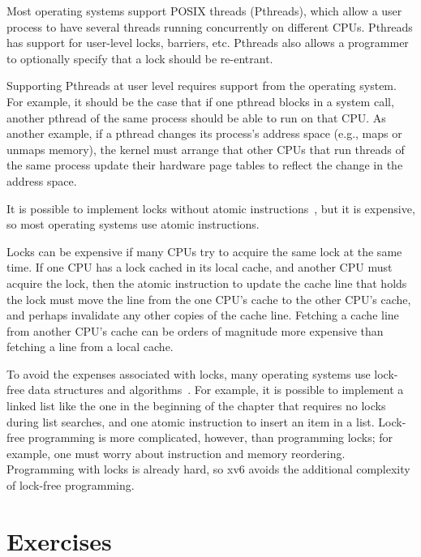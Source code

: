 Most operating systems support POSIX threads (Pthreads), which allow a
user process to have several threads running concurrently on different
CPUs.  Pthreads has support for user-level locks, barriers, etc.
Pthreads also allows a programmer to optionally specify that a lock
should be re-entrant.

Supporting Pthreads at user level requires support from the operating
system. For example, it should be the case that if one pthread blocks
in a system call, another pthread of the same process should be able
to run on that CPU.  As another example, if a pthread changes its
process's address space (e.g., maps or unmaps memory), the kernel must
arrange that other CPUs that run threads of the same process update
their hardware page tables to reflect the change in the address space.

It is possible to implement locks without atomic
instructions~\cite{lamport:bakery}, but it is expensive, so most
operating systems use atomic instructions.

Locks can be expensive if many CPUs try to acquire the same lock
at the same time.  If one CPU has a lock
cached in its local cache, and another CPU must acquire the lock, then the
atomic instruction to update the cache line that holds the lock must move the line
from the one CPU's cache to the other CPU's cache, and perhaps
invalidate any other copies of the cache line.  Fetching a cache line from
another CPU's cache can be orders of magnitude more expensive than
fetching a line from a local cache.

To avoid the expenses associated with locks, many operating systems
use lock-free data structures and algorithms~\cite{herlihy:art,mckenney:rcuusage}.
For example, it is possible to implement a linked list like the one in
the beginning of the chapter that requires no locks during list
searches, and one atomic instruction to insert an item in a list.
Lock-free programming is more complicated, however, than programming
locks; for example, one must worry about instruction and memory
reordering.  Programming with locks is already hard, so xv6 avoids the
additional complexity of lock-free programming.

\section{Exercises}

